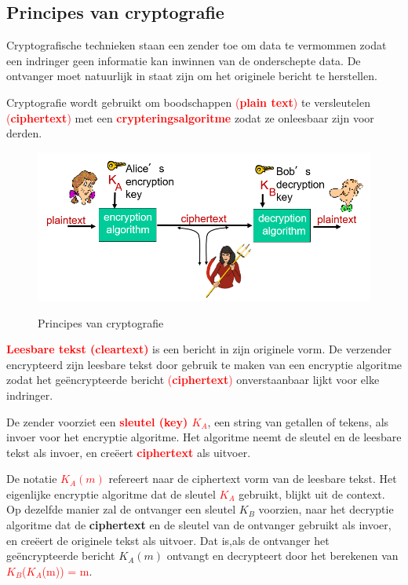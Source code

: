 \subsection{Principes van cryptografie}
Cryptografische technieken staan een zender toe om data te vermommen zodat een indringer geen informatie kan inwinnen van de onderschepte data. De ontvanger moet natuurlijk in staat zijn om het originele bericht te herstellen.

\noindent Cryptografie wordt gebruikt om boodschappen \textcolor{red}{(\textbf{plain text})} te versleutelen \textcolor{red}{(\textbf{ciphertext})} met een \textcolor{red}{\textbf{crypteringsalgoritme}} zodat ze onleesbaar zijn voor derden.

\begin{figure}[h]
    \centering
    \includegraphics[width=7in]{./img/imghfdst8/hfdst8puntje2.png}\\[1cm]
    \caption{Principes van cryptografie }      
    \label{fig:Principes van cryptografie }
\end{figure}

\noindent \textcolor{red}{\textbf{Leesbare tekst (cleartext)}} is een bericht in zijn originele vorm. De verzender encrypteerd zijn leesbare tekst door gebruik te maken van een encryptie algoritme zodat het geëncrypteerde bericht \textcolor{red}{(\textbf{ciphertext})} onverstaanbaar lijkt voor elke indringer. 

De zender voorziet een \textcolor{red}{\textbf{sleutel (key) $K_A$}}, een string van getallen of tekens, als invoer voor het encryptie algoritme. Het algoritme neemt de sleutel en de leesbare tekst als invoer, en creëert \textcolor{red}{\textbf{ciphertext}} als uitvoer.

De notatie \textcolor{red}{$K_A (m)$} refereert naar de ciphertext vorm van de leesbare tekst. Het eigenlijke encryptie algoritme dat de sleutel \textcolor{red}{$K_A $} gebruikt, blijkt uit de context.
Op dezelfde manier zal de ontvanger een sleutel $K_B$ voorzien, naar het decryptie algoritme dat de \textbf{ciphertext} en de sleutel van de ontvanger gebruikt als invoer, en creëert de originele tekst als uitvoer.
Dat is,als de ontvanger het geëncrypteerde bericht $K_A (m) $ ontvangt en decrypteert door het berekenen van \textcolor{red}{$K_B$($K_A$(m)) = m}.

